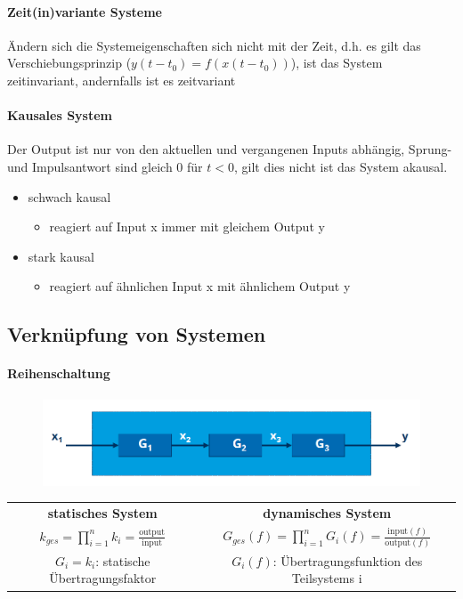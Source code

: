 \documentclass[12pt,a4paper]{article}
\begin{document}
\paragraph{Zeit(in)variante Systeme}
Ändern sich die Systemeigenschaften sich nicht mit der Zeit, d.h. es gilt das Verschiebungsprinzip ($y(t-t_0) = f(x(t-t_0))$), ist das System zeitinvariant, andernfalls ist es zeitvariant

\paragraph{Kausales System}
Der Output ist nur von den aktuellen und vergangenen Inputs abhängig, Sprung- und Impulsantwort sind gleich 0 für $t < 0$, gilt dies nicht ist das System akausal.
\begin{itemize}
\item schwach kausal
\begin{itemize}
\item reagiert auf Input x immer mit gleichem Output y
\end{itemize}
\item stark kausal
\begin{itemize}
\item reagiert auf ähnlichen Input x mit ähnlichem Output y
\end{itemize}
\end{itemize}

\subsection{Verknüpfung von Systemen}

\paragraph{Reihenschaltung}
\hspace{1pt}
\begin{figure}[H]
\includegraphics[scale=0.5]{./resources/reihenschaltung.png}
\end{figure}
\begin{tabular}{|c|c|}
\hline
\textbf{statisches System} & \textbf{dynamisches System} \\
$\displaystyle k_{ges} = \prod_{i=1}^n k_i = \frac{\text{output}}{\text{input}}$ & $\displaystyle G_{ges}(f) = \prod_{i=1}^n G_i(f) = \frac{\text{input}(f)}{\text{output}(f)}$ \\
\hline
$G_i = k_i$: statische Übertragungsfaktor & $G_i(f)$: Übertragungsfunktion des Teilsystems i \\
\hline
\end{tabular}
\newpage
\end{document}
